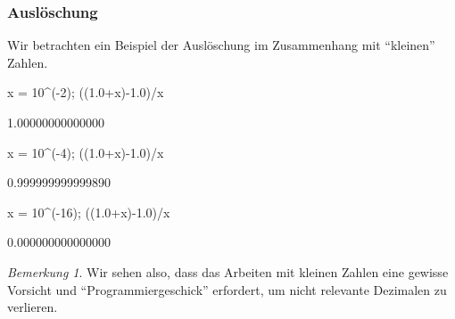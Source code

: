 \documentclass[fontsize=12pt,paper=a4,twoside,bibtotoc,idxtotoc,
liststotoc,pagesize,BCOR1.2cm,DIV15,chapterprefix,pagesize=pdftex]{scrbook}
\theoremstyle{plain}
\theoremstyle{definition}
\theoremstyle{remark}
\newtheorem{bem}[equation]{Bemerkung}
\begin{document}
\subsubsection{Auslöschung}
Wir betrachten ein Beispiel der Auslöschung im Zusammenhang mit ``kleinen'' Zahlen.
\begin{sagein}
x = 10^(-2); ((1.0+x)-1.0)/x
\end{sagein}
\begin{sageout}
  1.00000000000000
\end{sageout}
\begin{sagein}
x = 10^(-4); ((1.0+x)-1.0)/x
\end{sagein}
\begin{sageout}
 0.999999999999890
\end{sageout}
\begin{sagein}
x = 10^(-16); ((1.0+x)-1.0)/x
\end{sagein}
\begin{sageout}
  0.000000000000000
\end{sageout}
\begin{bem}
 Wir sehen also, dass das Arbeiten mit kleinen Zahlen eine gewisse Vorsicht und ``Programmiergeschick'' erfordert, um nicht 
relevante Dezimalen zu verlieren.
\end{bem}
\end{document}
